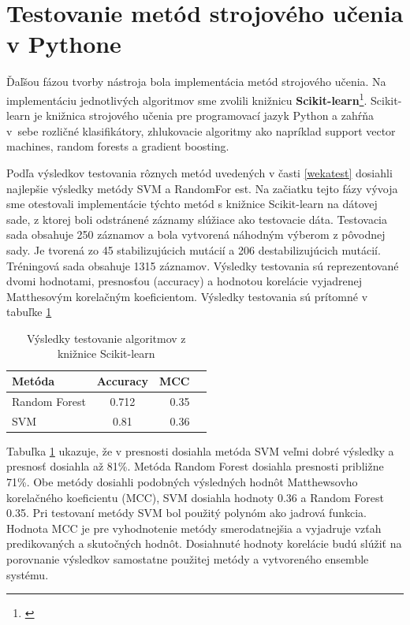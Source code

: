 \section{Testovanie metód strojového učenia v Pythone}

Ďaľšou fázou tvorby nástroja bola implementácia metód strojového učenia. Na implementáciu jednotlivých algoritmov sme zvolili knižnicu \textbf{Scikit-learn}\footnote{\url{}}. Scikit-learn je knižnica strojového učenia pre programovací jazyk Python a zahŕňa v sebe rozličné klasifikátory, zhlukovacie algoritmy ako napríklad support vector machines, random forests a gradient boosting.

Podľa výsledkov testovania rôznych metód uvedených v časti \ref{wekatest} dosiahli najlepšie výsledky metódy SVM a RandomFor est. Na začiatku tejto fázy vývoja sme otestovali implementácie týchto metód s knižnice Scikit-learn na dátovej sade, z ktorej boli odstránené záznamy slúžiace ako testovacie dáta. Testovacia sada obsahuje 250 záznamov a bola vytvorená náhodným výberom z pôvodnej sady. Je tvorená zo 45 stabilizujúcich mutácií a 206 destabilizujúcich mutácií. Tréningová sada obsahuje 1315 záznamov. Výsledky testovania sú reprezentované dvomi hodnotami, presnosťou (accuracy) a hodnotou korelácie vyjadrenej Matthesovým korelačným koeficientom. Výsledky testovania sú prítomné v tabuľke \ref{scikittest}
\begin{table}[H]
	\centering
	\begin{tabular}{ | l | c | r | l| }
		\hline 
		Metóda  & Accuracy & MCC \\ \hline
		Random Forest & 0.712 & 0.35\\ \hline
		SVM & 0.81 & 0.36 \\\hline
	\end{tabular}
	\caption {Výsledky testovanie algoritmov z knižnice Scikit-learn} \label{scikittest} 
\end{table}

Tabuľka \ref{scikittest} ukazuje, že v presnosti dosiahla metóda SVM veľmi dobré výsledky a presnosť dosiahla až 81\%. Metóda Random Forest dosiahla presnosti približne 71\%. Obe metódy dosiahli podobných výsledných hodnôt Matthewsovho korelačného koeficientu (MCC), SVM dosiahla hodnoty 0.36 a Random Forest 0.35. Pri testovaní metódy SVM bol použitý polynóm ako jadrová funkcia. Hodnota MCC je pre vyhodnotenie metódy smerodatnejšia a vyjadruje vzťah predikovaných a skutočných hodnôt. Dosiahnuté hodnoty korelácie budú slúžiť na porovnanie výsledkov samostatne použitej metódy a vytvoreného ensemble systému.

